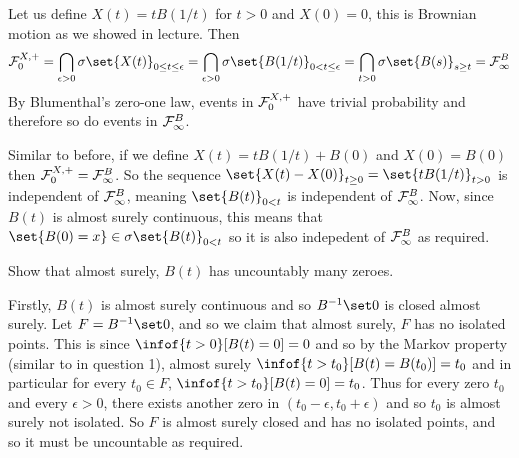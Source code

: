     \item Let us define $X(t)=tB(1/t)$ for $t>0$ and $X(0)=0$, this is Brownian motion as we showed in lecture.
    Then
    $$ {\cal F}_0^{X,+} = \bigcap_{\epsilon>0}\sigma\set{X(t)}_{0\leq t\leq\epsilon} = \bigcap_{\epsilon>0}\sigma\set{B(1/t)}_{0<t\leq\epsilon} = \bigcap_{t>0}\sigma\set{B(s)}_{s\geq t} =
    {\cal F}_\infty^B $$
    By Blumenthal's zero-one law, events in ${\cal F}_0^{X,+}$ have trivial probability and therefore so do events in ${\cal F}_\infty^B$.

    \item Similar to before, if we define $X(t)=tB(1/t)+B(0)$ and $X(0)=B(0)$ then ${\cal F}^{X,+}_0={\cal F}^B_\infty$.
    So the sequence $\set{X(t)-X(0)}_{t\geq0}=\set{tB(1/t)}_{t>0}$ is independent of ${\cal F}^B_\infty$, meaning $\set{B(t)}_{0<t}$ is independent of ${\cal F}^B_\infty$.
    Now, since $B(t)$ is almost surely continuous, this means that $\set{B(0)=x}\in\sigma\set{B(t)}_{0<t}$ so it is also indepedent of ${\cal F}^B_\infty$ as required.
\eenum

\bexerc

    Show that almost surely, $B(t)$ has uncountably many zeroes.

\eexerc

Firstly, $B(t)$ is almost surely continuous and so $B^{-1}\set0$ is closed almost surely.
Let $F=B^{-1}\set0$, and so we claim that almost surely, $F$ has no isolated points.
This is since $\infof{t>0}[B(t)=0]=0$ and so by the Markov property (similar to in question 1), almost surely $\infof{t>t_0}[B(t)=B(t_0)]=t_0$ and in particular for every $t_0\in F$,
$\infof{t>t_0}[B(t)=0]=t_0$.
Thus for every zero $t_0$ and every $\epsilon>0$, there exists another zero in $(t_0-\epsilon,t_0+\epsilon)$ and so $t_0$ is almost surely not isolated.
So $F$ is almost surely closed and has no isolated points, and so it must be uncountable as required.

\bye

